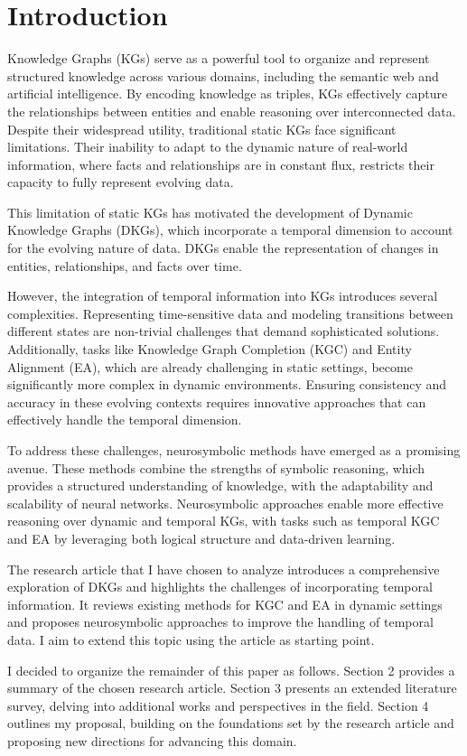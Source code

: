\section{Introduction}

Knowledge Graphs (KGs) \cite{hogan2021} serve as a powerful tool to organize and represent structured knowledge across various domains, including the semantic web and artificial 
intelligence. By encoding knowledge as triples, KGs effectively capture the relationships between entities and enable reasoning over interconnected data. Despite their widespread 
utility, traditional static KGs face significant limitations. Their inability to adapt to the dynamic nature of real-world information, where facts and relationships are in constant 
flux, restricts their capacity to fully represent evolving data. 

This limitation of static KGs has motivated the development of Dynamic Knowledge Graphs (DKGs), which incorporate a temporal dimension to account for the evolving nature of data. 
DKGs enable the representation of changes in entities, relationships, and facts over time.

However, the integration of temporal information into KGs introduces several complexities. Representing time-sensitive data and modeling transitions between different states are 
non-trivial challenges that demand sophisticated solutions. Additionally, tasks like Knowledge Graph Completion (KGC) and Entity Alignment (EA), which are already challenging in 
static settings, become significantly more complex in dynamic environments. Ensuring consistency and accuracy in these evolving contexts requires innovative approaches that can 
effectively handle the temporal dimension.

To address these challenges, neurosymbolic methods have emerged as a promising avenue. These methods combine the strengths of symbolic reasoning, which provides a structured 
understanding of knowledge, with the adaptability and scalability of neural networks. Neurosymbolic approaches enable more effective reasoning over dynamic and temporal KGs, with 
tasks such as temporal KGC and EA by leveraging both logical structure and data-driven learning.

The research article \cite{alam2024} that I have chosen to analyze introduces a comprehensive exploration of DKGs and highlights the challenges of incorporating temporal information. 
It reviews existing methods for KGC and EA in dynamic settings and proposes neurosymbolic approaches to improve the handling of temporal data. 
I aim to extend this topic using the article as starting point.

I decided to organize the remainder of this paper as follows. Section 2 provides a summary of the chosen research article. Section 3 presents an extended literature survey, 
delving into additional works and perspectives in the field. Section 4 outlines my proposal, building on the foundations set by the research article and proposing new directions for 
advancing this domain.